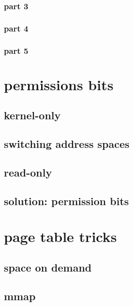 \subsubsection{part 3}


\subsubsection{part 4}

\subsubsection{part 5}


\section{permissions bits}
\subsection{kernel-only}


\subsection{switching address spaces}


\subsection{read-only}

\subsection{solution: permission bits}



\section{page table tricks}

\subsection{space on demand}


\subsection{mmap}


